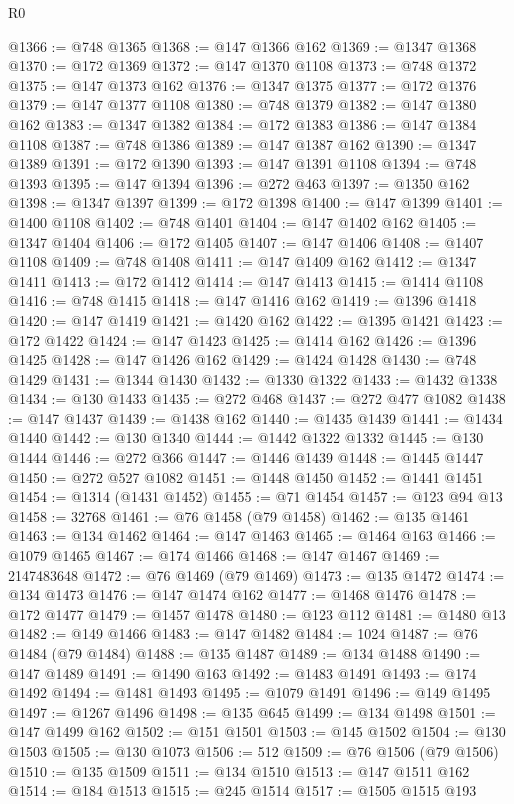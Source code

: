\begin{lexlean}{R0}
\begin{coremodule}
@1366 := @748 @1365
@1368 := @147 @1366 @162
@1369 := @1347 @1368
@1370 := @172 @1369
@1372 := @147 @1370 @1108
@1373 := @748 @1372
@1375 := @147 @1373 @162
@1376 := @1347 @1375
@1377 := @172 @1376
@1379 := @147 @1377 @1108
@1380 := @748 @1379
@1382 := @147 @1380 @162
@1383 := @1347 @1382
@1384 := @172 @1383
@1386 := @147 @1384 @1108
@1387 := @748 @1386
@1389 := @147 @1387 @162
@1390 := @1347 @1389
@1391 := @172 @1390
@1393 := @147 @1391 @1108
@1394 := @748 @1393
@1395 := @147 @1394
@1396 := @272 @463
@1397 := @1350 @162
@1398 := @1347 @1397
@1399 := @172 @1398
@1400 := @147 @1399
@1401 := @1400 @1108
@1402 := @748 @1401
@1404 := @147 @1402 @162
@1405 := @1347 @1404
@1406 := @172 @1405
@1407 := @147 @1406
@1408 := @1407 @1108
@1409 := @748 @1408
@1411 := @147 @1409 @162
@1412 := @1347 @1411
@1413 := @172 @1412
@1414 := @147 @1413
@1415 := @1414 @1108
@1416 := @748 @1415
@1418 := @147 @1416 @162
@1419 := @1396 @1418
@1420 := @147 @1419
@1421 := @1420 @162
@1422 := @1395 @1421
@1423 := @172 @1422
@1424 := @147 @1423
@1425 := @1414 @162
@1426 := @1396 @1425
@1428 := @147 @1426 @162
@1429 := @1424 @1428
@1430 := @748 @1429
@1431 := @1344 @1430
@1432 := @1330 @1322
@1433 := @1432 @1338
@1434 := @130 @1433
@1435 := @272 @468
@1437 := @272 @477 @1082
@1438 := @147 @1437
@1439 := @1438 @162
@1440 := @1435 @1439
@1441 := @1434 @1440
@1442 := @130 @1340
@1444 := @1442 @1322 @1332
@1445 := @130 @1444
@1446 := @272 @366
@1447 := @1446 @1439
@1448 := @1445 @1447
@1450 := @272 @527 @1082
@1451 := @1448 @1450
@1452 := @1441 @1451
@1454 := @1314 (@1431 @1452)
@1455 := @71 @1454
@1457 := @123 @94 @13
@1458 := 32768
@1461 := @76 @1458 (@79 @1458)
@1462 := @135 @1461
@1463 := @134 @1462
@1464 := @147 @1463
@1465 := @1464 @163
@1466 := @1079 @1465
@1467 := @174 @1466
@1468 := @147 @1467
@1469 := 2147483648
@1472 := @76 @1469 (@79 @1469)
@1473 := @135 @1472
@1474 := @134 @1473
@1476 := @147 @1474 @162
@1477 := @1468 @1476
@1478 := @172 @1477
@1479 := @1457 @1478
@1480 := @123 @112
@1481 := @1480 @13
@1482 := @149 @1466
@1483 := @147 @1482
@1484 := 1024
@1487 := @76 @1484 (@79 @1484)
@1488 := @135 @1487
@1489 := @134 @1488
@1490 := @147 @1489
@1491 := @1490 @163
@1492 := @1483 @1491
@1493 := @174 @1492
@1494 := @1481 @1493
@1495 := @1079 @1491
@1496 := @149 @1495
@1497 := @1267 @1496
@1498 := @135 @645
@1499 := @134 @1498
@1501 := @147 @1499 @162
@1502 := @151 @1501
@1503 := @145 @1502
@1504 := @130 @1503
@1505 := @130 @1073
@1506 := 512
@1509 := @76 @1506 (@79 @1506)
@1510 := @135 @1509
@1511 := @134 @1510
@1513 := @147 @1511 @162
@1514 := @184 @1513
@1515 := @245 @1514
@1517 := @1505 @1515 @193

\end{coremodule}
\end{lexlean}
